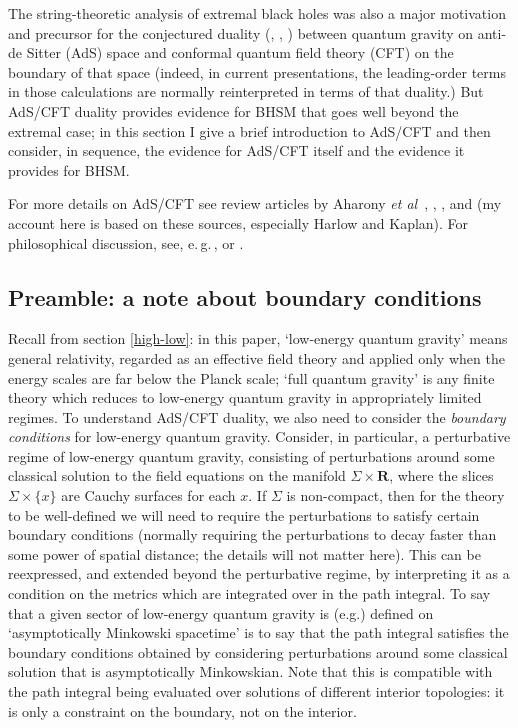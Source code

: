 \documentclass[12pt]{article}
\newcommand{\egc}{\mbox{e.\,g.\,}}
\newcommand{\re}{\ensuremath{\mathbf{R}}}
\begin{document}
The string-theoretic analysis of extremal black holes was also a major motivation and precursor for the conjectured duality (, , ) between quantum gravity on anti-de Sitter (AdS) space and conformal quantum field theory (CFT) on the boundary of that space (indeed, in current presentations, the leading-order terms in those calculations are normally reinterpreted in terms of that duality.) But AdS/CFT duality provides evidence for BHSM that goes well beyond the extremal case; in this section I give a brief introduction to AdS/CFT and then consider, in sequence, the evidence for AdS/CFT itself and the evidence it provides for BHSM.

For more details on AdS/CFT see review articles by Aharony \emph{et al}~\citeyear{aharonyadscftreview}, , , and  (my account here is based on these sources, especially Harlow and Kaplan). For philosophical discussion, see, \egc,  or .

\subsection{Preamble: a note about boundary conditions}

Recall from section \ref{high-low}: in this paper, `low-energy quantum gravity' means general relativity, regarded as an effective field theory and applied only when the energy scales are far below the Planck scale; `full quantum gravity' is any finite theory which reduces to low-energy quantum gravity in appropriately limited regimes. To understand AdS/CFT duality, we also need to consider the \emph{boundary conditions} for low-energy quantum gravity. Consider, in particular, a perturbative regime of low-energy quantum gravity, consisting of perturbations around some classical solution to the field equations on the manifold $\Sigma \times \re$, where the slices $\Sigma \times \{x\}$ are Cauchy surfaces for each $x$. If $\Sigma$ is non-compact, then for the theory to be well-defined we will need to require the perturbations to satisfy certain boundary conditions (normally requiring the perturbations to decay faster than some power of spatial distance; the details will not matter here). This can be reexpressed, and extended beyond the perturbative regime, by interpreting it as a condition on the metrics which are integrated over in the path integral. To say that a given sector of low-energy quantum gravity is (e.g.) defined on `asymptotically Minkowski spacetime' is to say that the path integral satisfies the boundary conditions obtained by considering perturbations around some classical solution that is asymptotically Minkowskian. Note that this is compatible with the path integral being evaluated over solutions of different interior topologies: it is only a constraint on the boundary, not on the interior.
\end{document}
